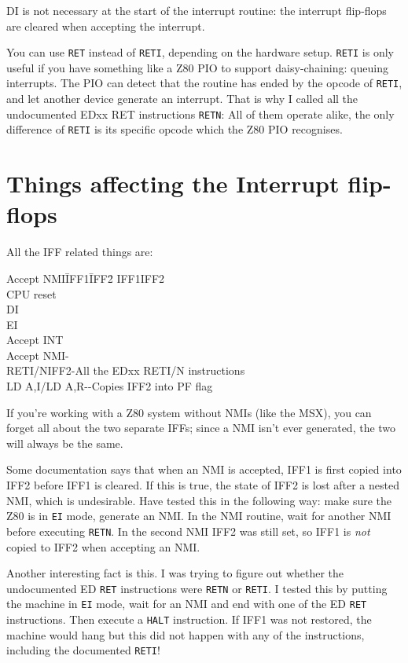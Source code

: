 \documentclass[oneside,a4paper]{book}
\begin{document}
{\ttfamily DI} is not necessary at the start of the interrupt routine: the interrupt flip-flops are cleared when accepting the interrupt.

You can use {\tt RET} instead of {\tt RETI}, depending on the hardware setup. {\tt RETI} is only useful if you have something like a Z80 PIO to support daisy-chaining: queuing interrupts. The PIO can detect that the routine has ended by the opcode of {\tt RETI}, and let another device generate an interrupt. That is why I called all the undocumented EDxx RET instructions {\tt RETN}: All of them operate alike, the only difference of {\tt RETI} is its specific opcode which the Z80 PIO recognises.


\section{Things affecting the Interrupt flip-flops}
\label{flipflop}

All the IFF related things are:

\begin{tabbing}
	Accept NMI{\qquad}\=IFF1{\qquad}\=IFF2{\qquad}\= \kill
	\>IFF1\>IFF2\>\\
	CPU reset\>0\\
	{\ttfamily DI}\>0\\
	{\ttfamily EI}\>1\\
	Accept INT\>0\\
	Accept NMI\>-\\
	{\ttfamily RETI/N}\>IFF2\>-\>All the EDxx RETI/N instructions\\
	{\ttfamily LD A,I/LD A,R}\>-\>-\>Copies IFF2 into PF flag
\end{tabbing}

If you're working with a Z80 system without NMIs (like the MSX), you can forget all about the two separate IFFs; since a NMI isn't ever generated, the two will always be the same. 

Some documentation says that when an NMI is accepted, IFF1 is first copied into IFF2 before IFF1 is cleared. If this is true, the state of IFF2 is lost after a nested NMI, which is undesirable. Have tested this in the following way: make sure the Z80 is in {\tt EI} mode, generate an NMI. In the NMI routine, wait for another NMI before executing {\tt RETN}. In the second NMI IFF2 was still set, so IFF1 is {\em not} copied to IFF2 when accepting an NMI.

Another interesting fact is this. I was trying to figure out whether the undocumented ED {\tt RET} instructions were {\tt RETN} or {\tt RETI}. I tested this by putting the machine in {\tt EI} mode, wait for an NMI and end with one of the ED {\tt RET} instructions. Then execute a {\tt HALT} instruction. If IFF1 was not restored, the machine would hang but this did not happen with any of the instructions, including the documented {\tt RETI}!
\end{document}
